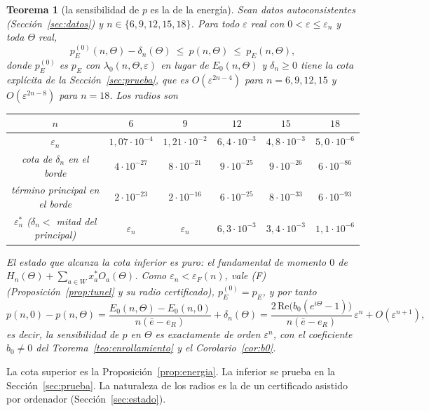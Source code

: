 \documentclass[11pt,a4paper]{article}
\newtheorem{teorema}{Teorema}
\theoremstyle{definition}
\theoremstyle{remark}
\newcommand{\eps}{\varepsilon}
\newcommand{\pE}{p_{E}}
\begin{document}
\begin{teorema}[la sensibilidad de $p$ es la de la energía]\label{teo:principal}
Sean datos autoconsistentes (Sección~\ref{sec:datos}) y $n\in\{6,9,12,15,18\}$. Para todo $\eps$ real
con $0<\eps\le\eps_n$ y toda $\Theta$ real,
\[
  p_E^{(0)}(n,\Theta)-\delta_n(\Theta)\ \le\ p(n,\Theta)\ \le\ \pE(n,\Theta),
\]
donde $p_E^{(0)}$ es $\pE$ con $\lambda_0(n,\Theta,\eps)$ en lugar de $E_0(n,\Theta)$ y $\delta_n\ge0$
tiene la cota explícita de la Sección~\ref{sec:prueba}, que es $O(\eps^{2n-4})$ para $n=6,9,12,15$ y
$O(\eps^{2n-8})$ para $n=18$. Los radios son
\begin{center}
\begin{tabular}{cccccc}
\toprule
$n$ & $6$ & $9$ & $12$ & $15$ & $18$\\
\midrule
$\eps_n$ & $1{,}07\cdot10^{-4}$ & $1{,}21\cdot10^{-2}$ & $6{,}4\cdot10^{-3}$ & $4{,}8\cdot10^{-3}$ & $5{,}0\cdot10^{-6}$\\
cota de $\delta_n$ en el borde & $4\cdot10^{-27}$ & $8\cdot10^{-21}$ & $9\cdot10^{-25}$ & $9\cdot10^{-26}$ & $6\cdot10^{-86}$\\
término principal en el borde & $2\cdot10^{-23}$ & $2\cdot10^{-16}$ & $6\cdot10^{-25}$ & $8\cdot10^{-33}$ & $6\cdot10^{-93}$\\
$\eps_n^*$ ($\delta_n<$ mitad del principal) & $\eps_n$ & $\eps_n$ & $6{,}3\cdot10^{-3}$ & $3{,}4\cdot10^{-3}$ & $1{,}1\cdot10^{-6}$\\
\bottomrule
\end{tabular}
\end{center}
El estado que alcanza la cota inferior es puro: el fundamental de momento $0$ de
$H_n(\Theta)+\sum_{a\in W}x^*_aO_a(\Theta)$. Como $\eps_n<\eps_F(n)$, vale (F) (Proposición~\ref{prop:tunel}
y su radio certificado), $p_E^{(0)}=\pE$, y por tanto
\[
  p(n,0)-p(n,\Theta)=\frac{E_0(n,\Theta)-E_0(n,0)}{n(\bar e-e_R)}+\delta_n(\Theta)
  =\frac{2\,\mathrm{Re}\big(b_0(e^{i\Theta}-1)\big)}{n(\bar e-e_R)}\,\eps^n+O(\eps^{n+1}),
\]
es decir, la sensibilidad de $p$ en $\Theta$ es exactamente de orden $\eps^n$, con el coeficiente
$b_0\ne0$ del Teorema~\ref{teo:enrollamiento} y el Corolario~\ref{cor:b0}.
\end{teorema}

\noindent
La cota superior es la Proposición~\ref{prop:energia}. La inferior se prueba en la
Sección~\ref{sec:prueba}. La naturaleza de los radios es la de un certificado asistido por ordenador
(Sección~\ref{sec:estado}).
\end{document}
